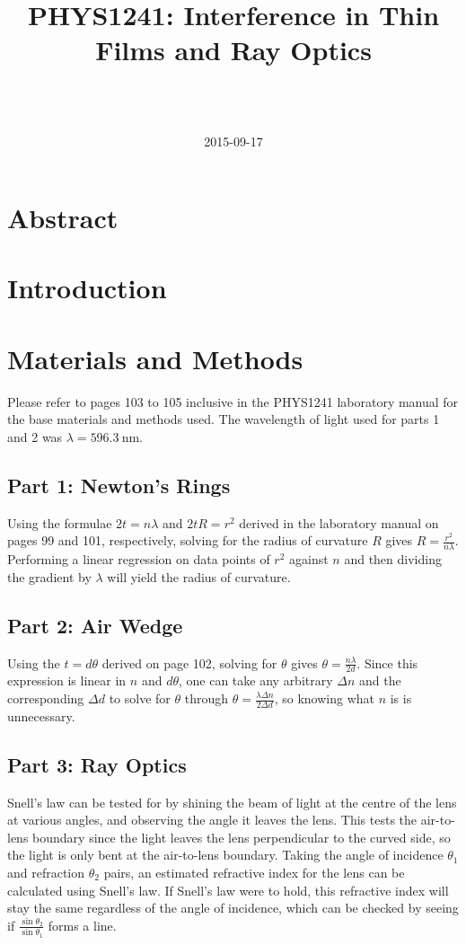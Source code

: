 \documentclass[a4paper]{scrartcl}
\begin{document}
\title{PHYS1241: Interference in Thin Films and Ray Optics}
\author{ \\ \\ }
\date{2015-09-17}
\maketitle

\section{Abstract}

\section{Introduction}

\section{Materials and Methods}
Please refer to pages 103 to 105 inclusive in the PHYS1241 laboratory manual for the base materials and methods used. The wavelength of light used for parts 1 and 2 was \(\lambda = \SI{596.3}{\nano\metre}\).

\subsection{Part 1: Newton's Rings}
Using the formulae \(2 t = n \lambda\) and \(2 t R = r^2\) derived in the laboratory manual on pages 99 and 101, respectively, solving for the radius of curvature \(R\) gives \(R = \frac{r^2}{n \lambda}\). Performing a linear regression on data points of \(r^2\) against \(n\) and then dividing the gradient by \(\lambda\) will yield the radius of curvature.

\subsection{Part 2: Air Wedge}
Using the \(t = d \theta\) derived on page 102, solving for \(\theta\) gives \(\theta = \frac{n \lambda}{2 d}\). Since this expression is linear in \(n\) and \(d \theta\), one can take any arbitrary \(\Delta n\) and the corresponding \(\Delta d\) to solve for \(\theta\) through \(\theta = \frac{\lambda \Delta n}{2 \Delta d}\), so knowing what \(n\) is is unnecessary.

\subsection{Part 3: Ray Optics}
Snell's law can be tested for by shining the beam of light at the centre of the lens at various angles, and observing the angle it leaves the lens. This tests the air-to-lens boundary since the light leaves the lens perpendicular to the curved side, so the light is only bent at the air-to-lens boundary. Taking the angle of incidence \(\theta_1\) and refraction \(\theta_2\) pairs, an estimated refractive index for the lens can be calculated using Snell's law. If Snell's law were to hold, this refractive index will stay the same regardless of the angle of incidence, which can be checked by seeing if \(\frac{\sin\theta_2}{\sin\theta_1}\) forms a line.
\end{document}
